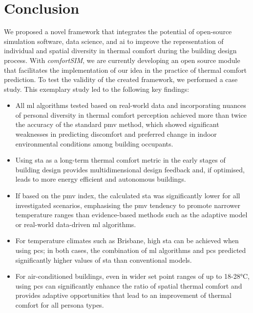 
\pagebreak
\section{Conclusion}

We proposed a novel framework that integrates the potential of open-source simulation software, data science, and \gls{ai} to improve the representation of individual and spatial diversity in thermal comfort during the building design process. With \textit{comfortSIM}, we are currently developing an open source module that facilitates the implementation of our idea in the practice of thermal comfort prediction. To test the validity of the created framework, we performed a case study. This exemplary study led to the following key findings:

\begin{itemize}

    \item All \gls{ml} algorithms tested based on real-world data and incorporating nuances of personal diversity in thermal comfort perception achieved more than twice the accuracy of the standard \gls{pmv} method, which showed significant weaknesses in predicting discomfort and preferred change in indoor environmental conditions among building occupants.

    \item Using \gls{sta} as a long-term thermal comfort metric in the early stages of building design provides multidimensional design feedback and, if optimised, leads to more energy efficient and autonomous buildings.
    
    \item If based on the \gls{pmv} index, the calculated \gls{sta} was significantly lower for all investigated scenarios, emphasising the \gls{pmv} tendency to promote narrower temperature ranges than evidence-based methods such as the adaptive model or real-world data-driven \gls{ml} algorithms.

    \item For temperature climates such as Brisbane, high \gls{sta} can be achieved when using \gls{pcs}; in both cases, the combination of \gls{ml} algorithms and \gls{pcs} predicted significantly higher values of \gls{sta} than conventional models.

    \item For air-conditioned buildings, even in wider set point ranges of up to 18-28°C, using \gls{pcs} can significantly enhance the ratio of spatial thermal comfort and provides adaptive opportunities that lead to an improvement of thermal comfort for all persona types.

\end{itemize}


